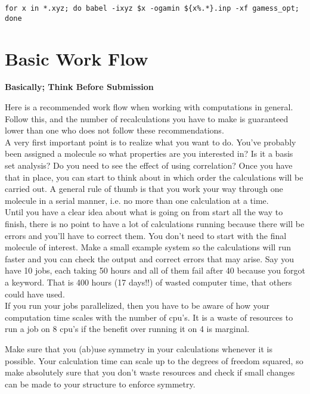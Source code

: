 \documentclass{article}
\begin{document}
\begin{lstlisting}
for x in *.xyz; do babel -ixyz $x -ogamin ${x%.*}.inp -xf gamess_opt; done
\end{lstlisting}

\newpage
\section{Basic Work Flow}

\begin{center}
\bf Basically; Think Before Submission
\end{center}



Here is a recommended work flow when working with computations in general.
Follow this, and the number of recalculations you have to make is guaranteed lower than one who does not follow these recommendations.\\

A very first important point is to realize what you want to do.
You've probably been assigned a molecule so what properties are you interested in?
Is it a basis set analysis?
Do you need to see the effect of using correlation?
Once you have that in place, you can start to think about in which order the calculations will be carried out.
A general rule of thumb is that you work your way through one molecule in a serial manner, i.e. no more than one calculation at a time.\\

Until you have a clear idea about what is going on from start all the way to finish, there is no point to have a lot of calculations running because there will be errors and you'll have to correct them.
You don't need to start with the final molecule of interest.
Make a small example system so the calculations will run faster and you can check the output and correct errors that may arise.
Say you have 10 jobs, each taking 50 hours and all of them fail after 40 because you forgot a keyword.
That is 400 hours (17 days!!) of wasted computer time, that others could have used.\\

If you run your jobs parallelized, then you have to be aware of how your computation time scales with the number of cpu's.
It is a waste of resources to run a job on 8 cpu's if the benefit over running it on 4 is marginal.

Make sure that you (ab)use symmetry in your calculations whenever it is possible.
Your calculation time can scale up to the degrees of freedom squared, so make absolutely sure that you don't waste resources and check if small changes can be made to your structure to enforce symmetry.
\end{document}
